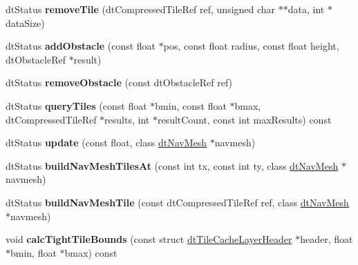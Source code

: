\begin{DoxyCompactItemize}
\mbox{\label{classdtTileCache_a8ead2a72687eec8644f64b3e3cf1942e}} 
dt\+Status {\bfseries remove\+Tile} (dt\+Compressed\+Tile\+Ref ref, unsigned char $\ast$$\ast$data, int $\ast$data\+Size)
\item 
\mbox{\label{classdtTileCache_afe3b81a5356fec16ad99f2efe2548deb}} 
dt\+Status {\bfseries add\+Obstacle} (const float $\ast$pos, const float radius, const float height, dt\+Obstacle\+Ref $\ast$result)
\item 
\mbox{\label{classdtTileCache_aec360f5f815534dd6b432d571831fe3b}} 
dt\+Status {\bfseries remove\+Obstacle} (const dt\+Obstacle\+Ref ref)
\item 
\mbox{\label{classdtTileCache_afa3fb52e3082723c52a2048698a26cb3}} 
dt\+Status {\bfseries query\+Tiles} (const float $\ast$bmin, const float $\ast$bmax, dt\+Compressed\+Tile\+Ref $\ast$results, int $\ast$result\+Count, const int max\+Results) const
\item 
\mbox{\label{classdtTileCache_a0a1b8db8998f7a0775a1f6f65597c053}} 
dt\+Status {\bfseries update} (const float, class \hyperlink{classdtNavMesh}{dt\+Nav\+Mesh} $\ast$navmesh)
\item 
\mbox{\label{classdtTileCache_ae501e709b8c918b9c60d87816d54bbab}} 
dt\+Status {\bfseries build\+Nav\+Mesh\+Tiles\+At} (const int tx, const int ty, class \hyperlink{classdtNavMesh}{dt\+Nav\+Mesh} $\ast$navmesh)
\item 
\mbox{\label{classdtTileCache_a58de8a233915bc3aa553d4cf4e10084d}} 
dt\+Status {\bfseries build\+Nav\+Mesh\+Tile} (const dt\+Compressed\+Tile\+Ref ref, class \hyperlink{classdtNavMesh}{dt\+Nav\+Mesh} $\ast$navmesh)
\item 
\mbox{\label{classdtTileCache_ac3e71498a991117139f007f53ce0a822}} 
void {\bfseries calc\+Tight\+Tile\+Bounds} (const struct \hyperlink{structdtTileCacheLayerHeader}{dt\+Tile\+Cache\+Layer\+Header} $\ast$header, float $\ast$bmin, float $\ast$bmax) const
\item 
\mbox{\label{classdtTileCache_a71b5f91b742cc8339d36ac7b1c04ac0e}} 
$$
\end{DoxyCompactItemize}
